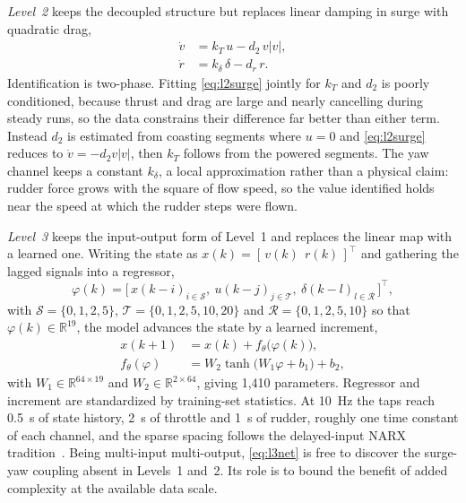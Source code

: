 \documentclass[conference]{IEEEtran}
\begin{document}
\emph{Level~2} keeps the decoupled structure but replaces linear damping in surge with quadratic drag,
\begin{align}
\dot v &= k_T\,u - d_2\,v|v|, \label{eq:l2surge}\\
\dot r &= k_\delta\,\delta - d_r\,r. \label{eq:l2yaw}
\end{align}
Identification is two-phase. Fitting \eqref{eq:l2surge} jointly for $k_T$ and $d_2$ is poorly conditioned, because thrust and drag are large and nearly cancelling during steady runs, so the data constrains their difference far better than either term. Instead $d_2$ is estimated from coasting segments where $u=0$ and \eqref{eq:l2surge} reduces to $\dot v=-d_2v|v|$, then $k_T$ follows from the powered segments. The yaw channel keeps a constant $k_\delta$, a local approximation rather than a physical claim: rudder force grows with the square of flow speed, so the value identified holds near the speed at which the rudder steps were flown.

\emph{Level~3} keeps the input-output form of Level~1 and replaces the linear map with a learned one. Writing the state as $x(k)=[\,v(k)\ \ r(k)\,]^{\top}$ and gathering the lagged signals into a regressor,
\begin{equation}
\varphi(k)=\bigl[\,x(k{-}i)_{i\in\mathcal{S}},\ u(k{-}j)_{j\in\mathcal{T}},\ \delta(k{-}l)_{l\in\mathcal{R}}\,\bigr]^{\top},
\label{eq:l3reg}
\end{equation}
with $\mathcal{S}=\{0,1,2,5\}$, $\mathcal{T}=\{0,1,2,5,10,20\}$ and $\mathcal{R}=\{0,1,2,5,10\}$ so that $\varphi(k)\in\mathbb{R}^{19}$, the model advances the state by a learned increment,
\begin{align}
x(k{+}1) &= x(k) + f_\theta\bigl(\varphi(k)\bigr), \label{eq:l3update}\\
f_\theta(\varphi) &= W_2\tanh\!\bigl(W_1\varphi + b_1\bigr) + b_2, \label{eq:l3net}
\end{align}
with $W_1\in\mathbb{R}^{64\times19}$ and $W_2\in\mathbb{R}^{2\times64}$, giving 1{,}410 parameters. Regressor and increment are standardized by training-set statistics. At 10~Hz the taps reach 0.5~s of state history, 2~s of throttle and 1~s of rudder, roughly one time constant of each channel, and the sparse spacing follows the delayed-input NARX tradition~\cite{lin1997delay}. Being multi-input multi-output, \eqref{eq:l3net} is free to discover the surge-yaw coupling absent in Levels~1 and~2. Its role is to bound the benefit of added complexity at the available data scale.
\end{document}
